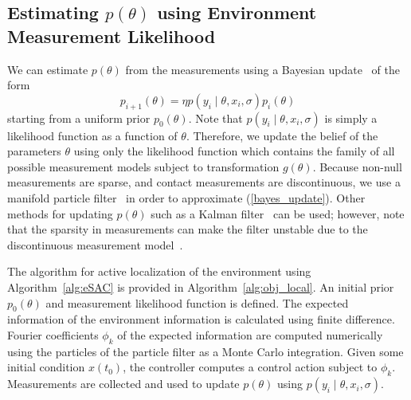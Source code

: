 \documentclass[conference]{IEEEtran}
\begin{document}
\subsection{Estimating $p(\theta)$ using Environment Measurement Likelihood}

We can estimate $p(\theta)$ from the measurements using a Bayesian update~\cite{vapnik1998statistical, koval2015pose} of the form
\begin{equation} \label{bayes_update}
p_{i+1}(\theta) = \eta p(y_i \mid \theta, x_i, \sigma) p_i(\theta) 
\end{equation}
starting from a uniform prior $p_0(\theta)$.
Note that $p(y_i \mid \theta, x_i, \sigma)$ is simply a likelihood function as a function of $\theta$.
Therefore, we update the belief of the parameters $\theta$ using only the likelihood function which contains the family of all possible measurement models subject to transformation $g(\theta)$.
Because non-null measurements are sparse, and contact measurements are discontinuous, we use a manifold particle filter~\cite{koval2015pose,particle_filter,van2001unscented} in order to approximate (\ref{bayes_update}).
Other methods for updating $p(\theta)$ such as a Kalman filter~\cite{julier1997new} can be used; however, note that the sparsity in measurements can make the filter unstable due to the discontinuous measurement model~\cite{koval2015pose}.



The algorithm for active localization of the environment using Algorithm~\ref{alg:eSAC} is provided in Algorithm~\ref{alg:obj_local}.
An initial prior $p_0(\theta)$ and measurement likelihood function is defined.
The expected information of the environment information is calculated using finite difference.
Fourier coefficients $\phi_k$ of the expected information are computed numerically using the particles of the particle filter as a Monte Carlo integration.
Given some initial condition $x(t_0)$, the controller computes a control action subject to $\phi_k$.
Measurements are collected and used to update $p(\theta)$ using $p(y_i \mid \theta, x_i, \sigma)$.
\end{document}
